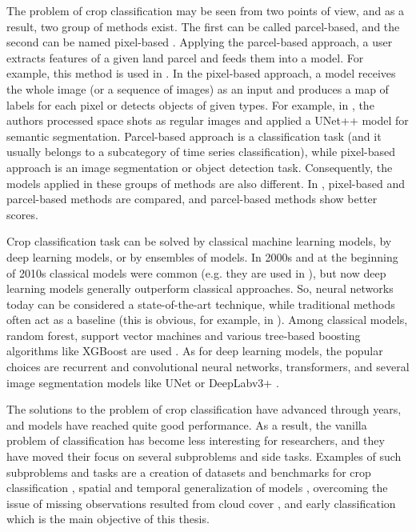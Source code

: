 \documentclass{article}
\begin{document}
The problem of crop classification may be seen from two points of view, and as a result, two group of methods exist. The first can be called parcel-based, and the second can be named pixel-based \cite{doi:10.5721/EuJRS20124535}. Applying the parcel-based approach, a user extracts features of a given land parcel and feeds them into a model. For example, this method is used in \cite{brandt2019spatiotemporal}. In the pixel-based approach, a model receives the whole image (or a sequence of images) as an input and produces a map of labels for each pixel or detects objects of given types. For example, in \cite{WANG2022107249}, the authors processed space shots as regular images and applied a UNet++ model for semantic segmentation. Parcel-based approach is a classification task (and it usually belongs to a subcategory of time series classification), while pixel-based approach is an image segmentation or object detection task. Consequently, the models applied in these groups of methods are also different. In \cite{doi:10.5721/EuJRS20124535}, pixel-based and parcel-based methods are compared, and parcel-based methods show better scores.

Crop classification task can be solved by classical machine learning models, by deep learning models, or by ensembles of models. In 2000s and at the beginning of 2010s classical models were common (e.g. they are used in \cite{doi:10.5721/EuJRS20124535}), but now deep learning models generally outperform classical approaches. So, neural networks today can be considered a state-of-the-art technique, while traditional methods often act as a baseline (this is obvious, for example, in \cite{breizhcrops2020}). Among classical models, random forest, support vector machines and various tree-based boosting algorithms like XGBoost are used \cite{ZHONG2019430}. As for deep learning models, the popular choices are recurrent and convolutional neural networks, transformers, and several image segmentation models like UNet or DeepLabv3+ \cite{WANG2022107249}.

The solutions to the problem of crop classification have advanced through years, and models have reached quite good performance. As a result, the vanilla problem of classification has become less interesting for researchers, and they have moved their focus on several subproblems and side tasks. Examples of such subproblems and tasks are a creation of datasets and benchmarks for crop classification \cite{breizhcrops2020, sykas2022sentinel2}, spatial and temporal generalization of models \cite{nyborg2022generalized, khanna2022activation}, overcoming the issue of missing observations resulted from cloud cover \cite{metzger2021crop}, and early classification \cite{rußwurm2022endtoend} which is the main objective of this thesis.
\end{document}
